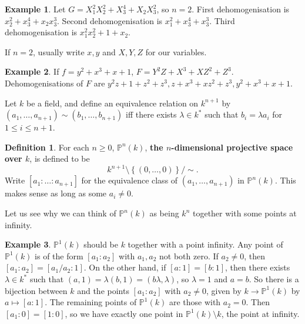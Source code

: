 \documentclass{article}
\renewcommand{\P}{\mathbb{P}}
\newcommand{\rb}[1]{\left( #1 \right)}
\renewcommand{\sb}[1]{\left[ #1 \right]}
\newcommand{\cb}[1]{\left\{ #1 \right\}}
\theoremstyle{definition}\newtheorem{definition}{Definition}[section]
\theoremstyle{definition}\newtheorem{remark}[definition]{Remark}
\theoremstyle{definition}\newtheorem*{example}{Example}
\theoremstyle{definition}\newtheorem*{note}{Note}
\begin{document}
\begin{example}
Let $ G = X_1^2X_2^2 + X_3^4 + X_2X_3^2 $, so $ n = 2 $. First dehomogenisation is $ x_2^2 + x_3^4 + x_2x_3^3 $. Second dehomogenisation is $ x_1^2 + x_3^4 + x_3^3 $. Third dehomogenisation is $ x_1^2x_2^2 + 1 + x_2 $.
\end{example}

If $ n = 2 $, usually write $ x, y $ and $ X, Y, Z $ for our variables.

\begin{example}
If $ f = y^2 + x^3 + x + 1 $, $ F = Y^2Z + X^3 + XZ^2 + Z^3 $. Dehomogenisations of $ F $ are $ y^2z + 1 + z^2 + z^3, z + x^3 + xz^2 + z^3, y^2 + x^3 + x + 1 $.
\end{example}

Let $ k $ be a field, and define an equivalence relation on $ k^{n + 1} $ by $ \rb{a_1, \dots, a_{n + 1}} \sim \rb{b_1, \dots, b_{n + 1}} $ iff there exists $ \lambda \in k^* $ such that $ b_i = \lambda a_i $ for $ 1 \le i \le n + 1 $.

\begin{definition}
For each $ n \ge 0 $, $ \P^n\rb{k} $, \textbf{the $ n $-dimensional projective space over $ k $}, is defined to be
$$ k^{n + 1} \setminus \cb{\rb{0, \dots, 0}} / \sim. $$
Write $ \sb{a_1 : \dots : a_{n + 1}} $ for the equivalence class of $ \rb{a_1, \dots, a_{n + 1}} $ in $ \P^n\rb{k} $. This makes sense as long as some $ a_i \ne 0 $.
\end{definition}

Let us see why we can think of $ \P^n\rb{k} $ as being $ k^n $ together with some points at infinity.

\begin{example}
$ \P^1\rb{k} $ should be $ k $ together with a point infinity. Any point of $ \P^1\rb{k} $ is of the form $ \sb{a_1 : a_2} $ with $ a_1, a_2 $ not both zero. If $ a_2 \ne 0 $, then $ \sb{a_1 : a_2} = \sb{a_1 / a_2 : 1} $. On the other hand, if $ \sb{a : 1} = \sb{b : 1} $, then there exists $ \lambda \in k^* $ such that $ \rb{a, 1} = \lambda\rb{b, 1} = \rb{b\lambda, \lambda} $, so $ \lambda = 1 $ and $ a = b $. So there is a bijection between $ k $ and the points $ \sb{a_1 : a_2} $ with $ a_2 \ne 0 $, given by $ k \to \P^1\rb{k} $ by $ a \mapsto \sb{a : 1} $. The remaining points of $ \P^1\rb{k} $ are those with $ a_2 = 0 $. Then $ \sb{a_1 : 0} = \sb{1 : 0} $, so we have exactly one point in $ \P^1\rb{k} \setminus k $, the point at infinity.
\end{example}
\end{document}

